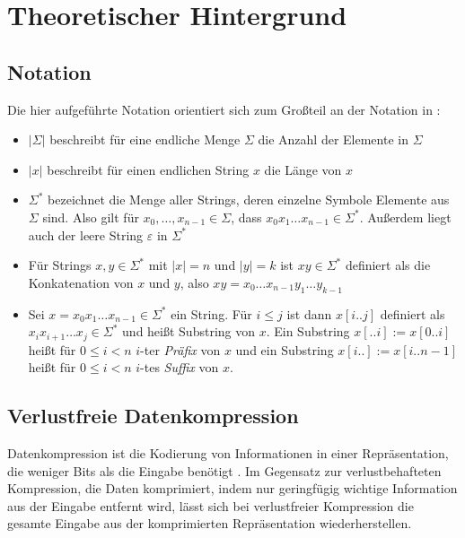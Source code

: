 \chapter{Theoretischer Hintergrund}

\section{Notation}

Die hier aufgeführte Notation orientiert sich zum Großteil an der Notation in \cite{kieffer_grammar-based_2000}:
\begin{itemize}
	\item $|\Sigma|$ beschreibt für eine endliche Menge $\Sigma$ die Anzahl der Elemente in $\Sigma$
	\item $|x|$ beschreibt für einen endlichen String $x$ die Länge von $x$
	\item $\Sigma^*$ bezeichnet die Menge aller Strings, deren einzelne Symbole Elemente aus $\Sigma$ sind. Also gilt für $x_0, \dots, x_{n-1} \in \Sigma$, dass $x_0 x_1 \dots x_{n-1} \in \Sigma^*$. Außerdem liegt auch der leere String $\varepsilon$ in $\Sigma^*$
	\item Für Strings $x, y \in \Sigma^*$ mit $|x| = n$ und $|y| = k$ ist $xy \in \Sigma^*$ definiert als die Konkatenation von $x$ und $y$, also $xy = x_0 \dots x_{n-1} y_1 \dots y_{k-1}$ 
	\item Sei $x = x_0 x_1 \dots x_{n-1} \in \Sigma^*$ ein String. Für $i \leq j$ ist dann $x[i..j]$ definiert als $x_i x_{i+1} \dots x_j \in \Sigma^*$ und heißt Substring von $x$. Ein Substring $x[..i] := x[0..i]$ heißt für $0 \leq i < n$ $i$-ter \emph{Präfix} von $x$ und ein Substring $x[i..] := x[i..n - 1]$ heißt für $0 \leq i < n$ $i$-tes \emph{Suffix} von $x$.
\end{itemize}

\section{Verlustfreie Datenkompression}

Datenkompression ist die Kodierung von Informationen in einer Repräsentation, die weniger Bits als die Eingabe benötigt \cite{mahdi_implementing_2012}. 
Im Gegensatz zur verlustbehafteten Kompression, die Daten komprimiert, indem nur geringfügig wichtige Information aus der Eingabe entfernt wird, lässt sich bei verlustfreier Kompression die gesamte Eingabe aus der komprimierten Repräsentation wiederherstellen. 

